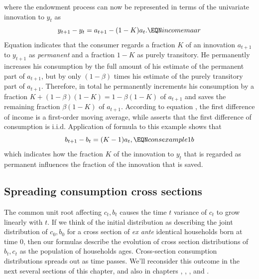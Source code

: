 where the endowment process can now be represented in terms of the univariate innovation to $y_t$ as
$$ y_{t+1} - y_t = a_{t+1} - (1-K) a_t. \EQN incomemaar $$
Equation  indicates that the consumer regards a fraction $K$ of an innovation $a_{t+1}$ to $y_{t+1}$
as {\it permanent} and a fraction $1-K$ as purely transitory. He permanently increases his consumption by the full amount of his estimate of the permanent part of $a_{t+1}$,
but by only $(1-\beta)$ times his estimate of the purely transitory part of $a_{t+1}$.   Therefore, in total  he permanently increments his  consumption by
 a fraction $K + (1-\beta) (1-K) = 1 - \beta (1-K)$  of $a_{t+1}$ and saves the remaining fraction $\beta (1-K)$ of $a_{t+1}$.
  According to equation , the first difference of income is a first-order moving average, while 
  asserts that the first difference of consumption is   i.i.d.
  Application of formula 
to this example shows that
$$ b_{t+1} - b_t = (K-1) a_t , \EQN consexample1b $$
which indicates how the fraction $K$ of the innovation to $y_t$ that is regarded as permanent influences the fraction of the innovation that is saved.



\subsection{Spreading consumption cross sections}
The common  unit root affecting $c_t, b_t$  causes  the time $t$ variance of $c_t$ to grow linearly with $t$.
If we think of the initial distribution as describing the joint distribution of $c_0, b_0$ for a cross section
of {\it ex ante} identical households born at time $0$, then our  formulas  describe the evolution of  cross section distributions of  $b_t, c_t$ as the population of households ages.  Cross-section consumption distributions  spreads out as time passes.%
We'll reconsider this outcome in the next several  sections of this chapter, and also in chapters , , ,  and
. 






